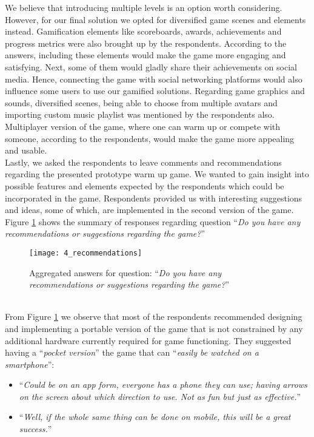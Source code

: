We believe that introducing multiple levels is an option worth considering. However, for our final solution we opted for diversified game scenes and elements instead. Gamification elements like scoreboards, awards, achievements and progress metrics were also brought up by the respondents. %
According to the answers, including these elements would make the game more engaging and satisfying. Next, some of them would gladly share their achievements on social media. Hence, connecting the game with social networking platforms would also influence some users to use our gamified solutions. Regarding game graphics and sounds, diversified scenes, being able to choose from multiple avatars and importing custom music playlist was mentioned by the respondents also. Multiplayer version of the game, where one can warm up or compete with someone, according to the respondents, would make the game more appealing and usable. \\Lastly, we asked the respondents to leave comments and recommendations regarding the presented prototype warm up game. We wanted to gain insight into possible features and elements expected by the respondents which could be incorporated in the game. Respondents provided us with interesting suggestions and ideas, some of which, are implemented in the second version of the game. Figure \ref{fig:4_recommendations} shows the summary of responses regarding question ``\textit{Do you have any recommendations or suggestions regarding the game?}''\\
\begin{figure}[h]
    \centering
    \texttt{[image: 4\_recommendations]}
    \caption[Recommendations and suggestions]{Aggregated answers for question: ``\textit{Do you have any recommendations or suggestions regarding the game?}''}
    \label{fig:4_recommendations}
\end{figure}\\ 
From Figure \ref{fig:4_recommendations} we observe that most of the respondents recommended designing and implementing a portable version of the game that is not constrained by any additional hardware currently required for game functioning. They suggested having a ``\textit{pocket version}'' the game that can ``\textit{easily be watched on a smartphone}'':
\begin{itemize}
\item ``\textit{Could be on an app form, everyone has a phone they can use; having arrows on the screen about which direction to use. Not as fun but just as effective.}''
\item ``\textit{Well, if the whole same thing can be done on mobile, this will be a great success.}''
\end{itemize}
